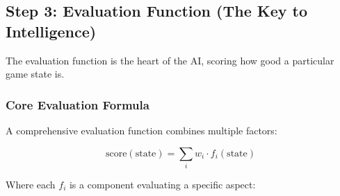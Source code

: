 \documentclass[12pt,a4paper]{article}
\begin{document}
\subsection{Step 3: Evaluation Function (The Key to Intelligence)}

The evaluation function is the heart of the AI, scoring how good a particular game state is.

\subsubsection{Core Evaluation Formula}

A comprehensive evaluation function combines multiple factors:

\begin{equation}
\text{score}(\text{state}) = \sum_{i} w_i \cdot f_i(\text{state})
\end{equation}

Where each $f_i$ is a component evaluating a specific aspect:
\end{document}

